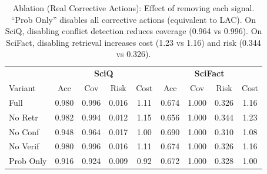 \begin{table}[t]
\centering
\footnotesize
\setlength{\tabcolsep}{2.5pt}
\caption{Ablation (Real Corrective Actions): Effect of removing each signal. ``Prob Only'' disables all corrective actions (equivalent to LAC). On SciQ, disabling conflict detection reduces coverage (0.964 vs 0.996). On SciFact, disabling retrieval increases cost (1.23 vs 1.16) and risk (0.344 vs 0.326).}
\label{tab:ablation}
\begin{tabular}{l|cccc|cccc}
\toprule
& \multicolumn{4}{c|}{\textbf{SciQ}} & \multicolumn{4}{c}{\textbf{SciFact}} \\
Variant & Acc & Cov & Risk & Cost & Acc & Cov & Risk & Cost \\
\midrule
Full & 0.980 & 0.996 & 0.016 & 1.11 & 0.674 & 1.000 & 0.326 & 1.16 \\
No Retr & 0.982 & 0.994 & 0.012 & 1.15 & 0.656 & 1.000 & 0.344 & 1.23 \\
No Conf & 0.948 & 0.964 & 0.017 & 1.00 & 0.690 & 1.000 & 0.310 & 1.08 \\
No Verif & 0.980 & 0.996 & 0.016 & 1.11 & 0.674 & 1.000 & 0.326 & 1.16 \\
Prob Only & 0.916 & 0.924 & 0.009 & 0.92 & 0.672 & 1.000 & 0.328 & 1.00 \\
\bottomrule
\end{tabular}
\end{table}
